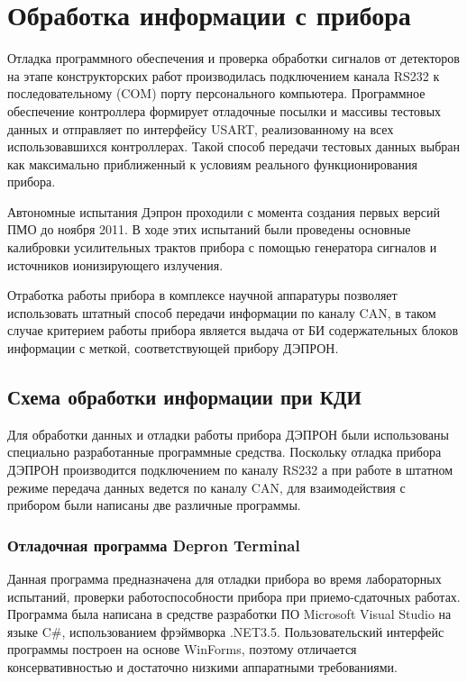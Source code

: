 \chapter{Обработка информации с прибора} \label{chapt3}


Отладка программного обеспечения и проверка обработки сигналов от детекторов на этапе конструкторских работ производилась подключением канала RS232 к последовательному (COM) порту персонального компьютера. Программное обеспечение контроллера формирует отладочные посылки и массивы тестовых данных и отправляет по интерфейсу USART, реализованному на всех использовавшихся контроллерах. Такой способ передачи тестовых данных выбран как максимально приближенный к условиям реального функционирования прибора. 

Автономные испытания Дэпрон проходили с момента создания первых версий ПМО до ноября 2011. В ходе этих испытаний были проведены основные калибровки усилительных трактов прибора с помощью генератора сигналов и источников ионизирующего излучения.

Отработка работы прибора в комплексе научной аппаратуры позволяет использовать штатный способ передачи информации по каналу CAN, в таком случае критерием работы прибора является выдача от БИ содержательных блоков информации с меткой, соответствующей прибору ДЭПРОН. 

\section{Схема обработки информации при КДИ}\label{sec3.1}

Для обработки данных и отладки работы прибора ДЭПРОН были использованы специально разработанные программные средства. Поскольку отладка прибора ДЭПРОН производится подключением по каналу RS232 а при работе в штатном режиме передача данных ведется по каналу CAN, для взаимодействия с прибором были написаны две различные программы.

\subsection{Отладочная программа Depron Terminal}

Данная программа предназначена для отладки прибора во время лабораторных испытаний, проверки работоспособности прибора при приемо-сдаточных работах. Программа была написана в средстве разработки ПО Microsoft Visual Studio на языке C\#,   использованием фрэймворка .NET3.5. Пользовательский интерфейс программы построен на основе WinForms, поэтому отличается консервативностью и достаточно низкими аппаратными требованиями.

